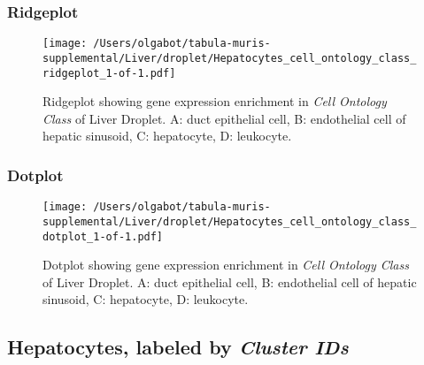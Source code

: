 \clearpage

\subsubsection{Ridgeplot}
\begin{figure}[h]
\centering
\texttt{[image: /Users/olgabot/tabula-muris-supplemental/Liver/droplet/Hepatocytes\_cell\_ontology\_class\_ridgeplot\_1-of-1.pdf]}

\caption{ Ridgeplot  showing gene expression enrichment in \emph{Cell Ontology Class} of Liver Droplet. A: duct epithelial cell, B: endothelial cell of hepatic sinusoid, C: hepatocyte, D: leukocyte.}
\end{figure}


\clearpage

\subsubsection{Dotplot}
\begin{figure}[h]
\centering
\texttt{[image: /Users/olgabot/tabula-muris-supplemental/Liver/droplet/Hepatocytes\_cell\_ontology\_class\_dotplot\_1-of-1.pdf]}

\caption{ Dotplot  showing gene expression enrichment in \emph{Cell Ontology Class} of Liver Droplet. A: duct epithelial cell, B: endothelial cell of hepatic sinusoid, C: hepatocyte, D: leukocyte.}
\end{figure}


\clearpage

\subsection{Hepatocytes, labeled by \emph{Cluster IDs}}
